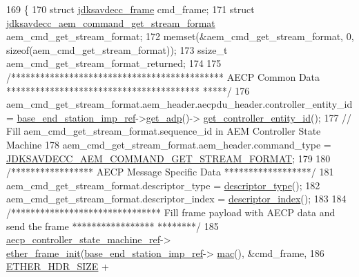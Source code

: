 \begin{DoxyCode}
169 \{
170     \textcolor{keyword}{struct }\hyperlink{structjdksavdecc__frame}{jdksavdecc\_frame} cmd\_frame;
171     \textcolor{keyword}{struct }\hyperlink{structjdksavdecc__aem__command__get__stream__format}{jdksavdecc\_aem\_command\_get\_stream\_format} 
      aem\_cmd\_get\_stream\_format;
172     memset(&aem\_cmd\_get\_stream\_format, 0, \textcolor{keyword}{sizeof}(aem\_cmd\_get\_stream\_format));
173     ssize\_t aem\_cmd\_get\_stream\_format\_returned;
174 
175     \textcolor{comment}{/******************************************** AECP Common Data ****************************************
      *****/}
176     aem\_cmd\_get\_stream\_format.aem\_header.aecpdu\_header.controller\_entity\_id = 
      \hyperlink{classavdecc__lib_1_1descriptor__base__imp_a550c969411f5f3b69f55cc139763d224}{base\_end\_station\_imp\_ref}->\hyperlink{classavdecc__lib_1_1end__station__imp_a471a74540ce6182fad0c17dfd010107e}{get\_adp}()->
      \hyperlink{classavdecc__lib_1_1adp_a0c0959a46658c0a22e9530334b2912da}{get\_controller\_entity\_id}();
177     \textcolor{comment}{// Fill aem\_cmd\_get\_stream\_format.sequence\_id in AEM Controller State Machine}
178     aem\_cmd\_get\_stream\_format.aem\_header.command\_type = 
      \hyperlink{group__command_ga44127c37d4df5fa78a40d28e053ac62c}{JDKSAVDECC\_AEM\_COMMAND\_GET\_STREAM\_FORMAT};
179 
180     \textcolor{comment}{/***************** AECP Message Specific Data ******************/}
181     aem\_cmd\_get\_stream\_format.descriptor\_type = \hyperlink{classavdecc__lib_1_1descriptor__base__imp_aefc543029ab093823c3f5b9d84f0ccc4}{descriptor\_type}();
182     aem\_cmd\_get\_stream\_format.descriptor\_index = \hyperlink{classavdecc__lib_1_1descriptor__base__imp_ac23c0a35276c07cfce8c8660700c2135}{descriptor\_index}();
183 
184     \textcolor{comment}{/******************************* Fill frame payload with AECP data and send the frame *****************
      ********/}
185     \hyperlink{namespaceavdecc__lib_a0b1b5aea3c0490f77cbfd9178af5be22}{aecp\_controller\_state\_machine\_ref}->
      \hyperlink{classavdecc__lib_1_1aecp__controller__state__machine_a86ff947c5e6b799cfb877d3767bfa1f9}{ether\_frame\_init}(\hyperlink{classavdecc__lib_1_1descriptor__base__imp_a550c969411f5f3b69f55cc139763d224}{base\_end\_station\_imp\_ref}->
      \hyperlink{classavdecc__lib_1_1end__station__imp_a08e1bd1861b3b8f447ea374a65ac11f9}{mac}(), &cmd\_frame,
186                                                         \hyperlink{namespaceavdecc__lib_a6c827b1a0d973e18119c5e3da518e65ca9512ad9b34302ba7048d88197e0a2dc0}{ETHER\_HDR\_SIZE} + 

\end{DoxyCode}
